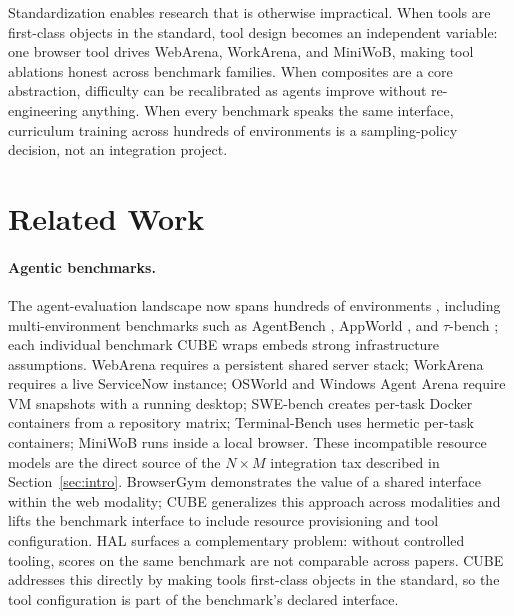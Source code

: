 \documentclass{article}
\begin{document}
Standardization enables research that is otherwise impractical. When tools are first-class objects in the standard, tool design becomes an independent variable: one browser tool drives WebArena, WorkArena, and MiniWoB, making tool ablations honest across benchmark families.
When composites are a core abstraction, difficulty can be recalibrated as agents improve without re-engineering anything. 
When every benchmark speaks the same interface, curriculum training across hundreds of environments is a sampling-policy decision, not an integration project.


\section{Related Work}
\label{sec:related}

\paragraph{Agentic benchmarks.}
The agent-evaluation landscape now spans hundreds of environments
\citep{yehudai2025surveyevaluationllmbasedagents}, including
multi-environment benchmarks such as AgentBench
\citep{Liu2023AgentBenchEL}, AppWorld \citep{appworld2024}, and
$\tau$-bench \citep{taubench2024}; each individual benchmark CUBE
wraps embeds strong infrastructure assumptions.
WebArena \citep{zhou2024webarena} requires a persistent shared server stack;
WorkArena \citep{drouin2024workarena} requires a live ServiceNow instance;
OSWorld \citep{xie2024osworld} and Windows Agent Arena \citep{bonatti2025windows}
require VM snapshots with a running desktop;
SWE-bench \citep{jimenez2023swebench,yang2024swebenchverified} creates per-task Docker
containers from a repository matrix;
Terminal-Bench \citep{merrill2026terminalbenchbenchmarkingagentshard} uses hermetic
per-task containers; MiniWoB \citep{Shi2017WorldOB} runs inside a local browser.
These incompatible resource models are the direct source of the $N \times M$ integration
tax described in Section~\ref{sec:intro}.
BrowserGym \citep{chezelles2025browsergym} demonstrates the value of a shared interface
within the web modality; CUBE generalizes this approach across modalities and lifts
the benchmark interface to include resource provisioning and tool configuration.
HAL \citep{kapoor2025holisticagentleaderboardmissing} surfaces a complementary problem:
without controlled tooling, scores on the same benchmark are not comparable across papers.
CUBE addresses this directly by making tools first-class objects in the standard, so
the tool configuration is part of the benchmark's declared interface.
\end{document}

